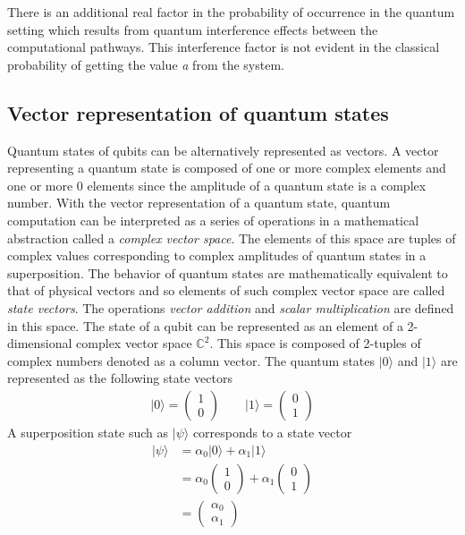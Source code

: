 There is an additional real factor in the probability of occurrence in the quantum setting which results from quantum interference effects between the computational pathways. This interference factor is not evident in the classical probability of getting the value \textit{a} from the system.

\subsection{Vector representation of quantum states}
Quantum states of qubits can be alternatively represented as vectors. A vector representing a quantum state is composed of one or more complex elements and one or more 0 elements since the amplitude of a quantum state is a complex number. With the vector representation of a quantum state, quantum computation can be interpreted as a series of operations in a mathematical abstraction called a \textit{complex vector space}. The elements of this space are tuples of complex values corresponding to complex amplitudes of quantum states in a superposition. The behavior of quantum states are mathematically equivalent to that of physical vectors and so elements of such complex vector space are called \textit{state vectors}. The operations \textit{vector addition} and \textit{scalar multiplication} are defined in this space. The state of a qubit can be represented as an element of a 2-dimensional complex vector space $\mathbb{C}^2$. This space is composed of 2-tuples of complex numbers denoted as a column vector. The quantum states $\vert 0 \rangle$ and $\vert 1 \rangle$ are represented as the following state vectors
\begin{align}
\vert 0 \rangle =
\begin{pmatrix}
	1\\
	0
\end{pmatrix}
\quad\quad
\vert 1 \rangle =
\begin{pmatrix}
	0\\
	1
\end{pmatrix}
\end{align}
A superposition state such as $\vert \psi \rangle$ corresponds to a state vector
\begin{equation*}
	\begin{split}
		\vert \psi \rangle &= \alpha_0\vert 0 \rangle + \alpha_1\vert 1 \rangle\\
		&= \alpha_0
		\begin{pmatrix}
			1\\
			0
		\end{pmatrix}
		+
		\alpha_1
		\begin{pmatrix}
			0\\
			1
		\end{pmatrix}\\
		&=
		\begin{pmatrix}
			\alpha_0\\
			\alpha_1
		\end{pmatrix}
	\end{split}
\end{equation*}
